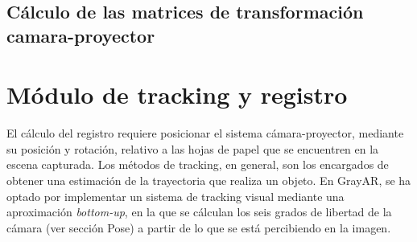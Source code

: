 



\subsection{Cálculo de las matrices de transformación camara-proyector}


\section{Módulo de tracking y registro}
El cálculo del registro requiere posicionar el sistema cámara-proyector, mediante su posición y rotación, relativo a las hojas de papel que se encuentren en la escena capturada. Los métodos de tracking, en general, son los encargados de obtener una estimación de la trayectoria que realiza un objeto. En GrayAR, se ha optado por implementar un sistema de tracking visual mediante una aproximación \textit{bottom-up}\cite{Marimon}, en la que se cálculan los seis grados de libertad de la cámara (ver sección Pose) a partir de lo que se está percibiendo en la imagen. 

